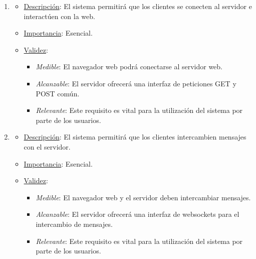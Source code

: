 \begin{enumerate}

\item %
  \begin{itemize}
  \item \underline{Descripción}: El sistema permitirá que los clientes se conecten al servidor e interactúen con la web.
  \item \underline{Importancia}: Esencial.
  \item \underline{Validez}:
    \begin{itemize}
    \item \textit{Medible}: El navegador web podrá conectarse al servidor web.
    \item \textit{Alcanzable}: El servidor ofrecerá una interfaz de peticiones GET y POST común.
    \item \textit{Relevante}: Este requisito es vital para la utilización del sistema por parte de los usuarios.
    \end{itemize}
  \end{itemize}

\item %
  \begin{itemize}
  \item \underline{Descripción}: El sistema permitirá que los clientes intercambien mensajes con el servidor.
  \item \underline{Importancia}: Esencial.
  \item \underline{Validez}:
    \begin{itemize}
    \item \textit{Medible}: El navegador web y el servidor deben intercambiar mensajes.
    \item \textit{Alcanzable}: El servidor ofrecerá una interfaz de websockets para el intercambio de mensajes.
    \item \textit{Relevante}: Este requisito es vital para la utilización del sistema por parte de los usuarios.
    \end{itemize}
  \end{itemize}


\end{enumerate}
